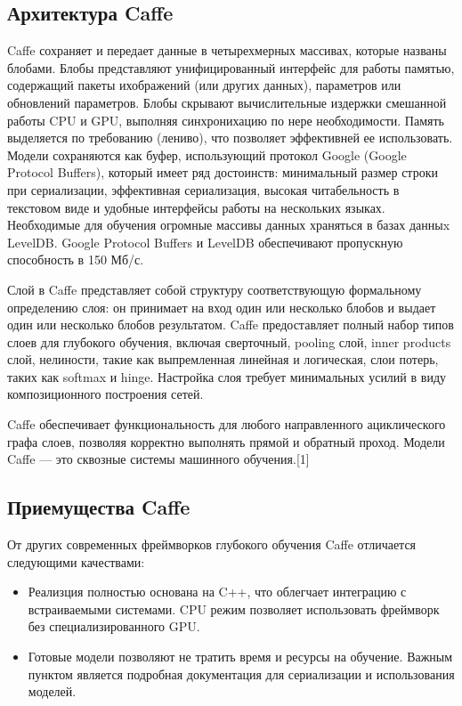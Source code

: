 \documentclass[a4paper,english,russian]{G2-105}
\begin{document}
\subsection{Архитектура Caffe}
\par Caffe сохраняет и передает данные в четырехмерных массивах, которые названы блобами. Блобы представляют унифицированный интерфейс для работы  памятью, содержащий пакеты ихображений (или других данных), параметров или обновлений параметров. Блобы скрывают вычислительные издержки смешанной работы CPU и GPU, выполняя синхронихацию по нере необходимости. Память выделяется по требованию (лениво), что позволяет эффективней ее использовать. Модели сохраняются как буфер, использующий протокол Google (Google Protocol Buffers), который имеет ряд достоинств: минимальный размер строки при сериализации, эффективная сериализация, высокая читабельность в текстовом виде и удобные интерфейсы работы на нескольких языках. Необходимые для обучения огромные массивы данных храняться в базах данныx LevelDB. Google Protocol Buffers и LevelDB обеспечивают пропускную способность в 150 Мб/с. 
\par Слой в Caffe представляет собой структуру соответствующую формальному определению слоя: он принимает на вход один или несколько блобов и выдает один или несколько блобов результатом. Caffe предоставляет полный набор типов слоев для глубокого обучения, включая сверточный, pooling слой, inner products слой, нелиности, такие как выпремленная линейная и логическая, слои потерь, таких как softmax и hinge. Настройка слоя требует минимальных усилий в виду композиционного построения сетей.
\par Caffe обеспечивает функциональность для любого направленного ациклического графа слоев, позволяя корректно выполнять прямой и обратный проход. Модели Caffe --- это сквозные системы машинного обучения.[1]
\ttl
\subsection{Приемущества Caffe}
\par От других современных фреймворков глубокого обучения Caffe отличается следующими качествами:
\begin{itemize}
	\item Реализция полностью основана на C++, что облегчает интеграцию с встраиваемыми системами. CPU режим позволяет использовать фреймворк без специализированного GPU.
	\item Готовые модели позволяют не тратить время и ресурсы на обучение. Важным пунктом является подробная документация для сериализации и использования моделей.
\end{itemize}
\ttl
\end{document}
